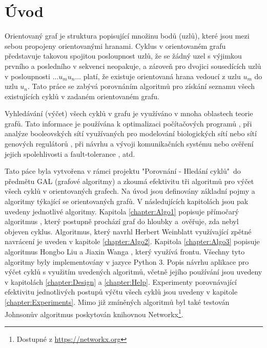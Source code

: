 
\chapter{Úvod}
    Orientovaný graf je struktura popisující množinu bodů (uzlů), které jsou mezi sebou propojeny orientovanými hranami. Cyklus v orientovaném grafu představuje takovou spojitou posloupnost uzlů, že se žádný uzel s výjimkou prvního a posledního v sekvenci neopakuje, a zároveň pro dvojici sousedících uzlů v posloupnosti $\dots u_m u_n \dots$ platí, že existuje orientovaná hrana vedoucí z uzlu $u_m$ do uzlu $u_n$. Tato práce se zabývá porovnáním algoritmů pro získání seznamu všech existujících cyklů v zadaném orientovaném grafu.

    Vyhledávání (výčet) všech cyklů v grafu je využíváno v mnoha oblastech teorie grafů. Tato informace je používána k optimalizaci počítačových programů \cite{Program_optimization}, při analýze booleovských sítí využívaných pro modelování biologických sítí nebo sítí genových regulátorů \cite{Biology}, při návrhu a vývoji komunikačních systému \cite{How_loopy_is_your_network} nebo ověření jejich spolehlivosti a fault-tolerance \cite{Network_Reliability}, atd.

    Tato páce byla vytvořena v rámci projektu "Porovnání - Hledání cyklů"~do předmětu GAL (grafové algoritmy) a zkoumá efektivitu tři algoritmů pro výčet všech cyklů v orientovaných grafech. Na úvod jsou definovány základní pojmy a algoritmy týkající se orientovaných grafů. V následujících kapitolách jsou pak uvedeny jednotlivé algoritmy. Kapitola \ref{chapter:Algo1} popisuje přímočarý algoritmus \cite[str. 287]{Book_algo}, který postupně prochází graf do hloubky a~ověřuje, zda nebyl objeven cyklus. Algoritmus, který navrhl Herbert Weinblatt využívající zpětné navrácení \cite{A_new_search_algorithm} je uveden v kapitole \ref{chapter:Algo2}. Kapitola \ref{chapter:Algo3} popisuje algoritmus Hongbo Liu a Jiaxin Wanga \cite{A_new_way_to_enumerate_cycles_in_graph}, který využívá frontu. Všechny tyto algoritmy byly implementovány v jazyce Python 3. Popis návrhu aplikace pro výčet cyklů s využitím uvedených algoritmů, včetně jejího používání jsou uvedeny v kapitolách \ref{chapter:Design} a \ref{chapter:Help}. Experimenty porovnávající efektivitu jednotlivých postupů výčtu všech cyklů jsou uvedeny v kapitole \ref{chapter:Experiments}. Mimo již zmíněných algoritmů byl také testován Johnsonův algoritmus \cite{Johnson_1975} poskytován knihovnou Networkx\footnote{Dostupné z \url{https://networkx.org}}.

